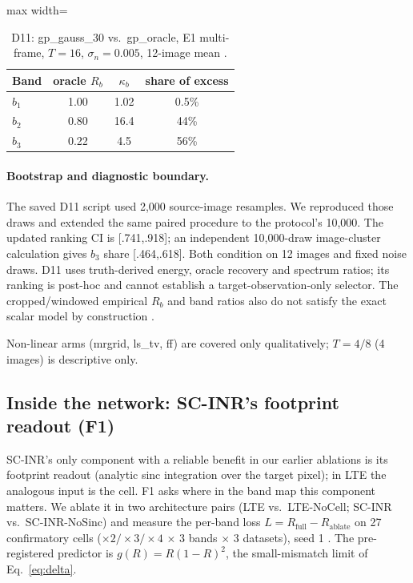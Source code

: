 \begin{table}[t]\centering\small
\caption{D11: gp\_gauss\_30 vs.\ gp\_oracle, E1 multi-frame, $T=16$,
$\sigma_n=0.005$, 12-image mean .}\label{tab:d11}
\begin{adjustbox}{max width=\linewidth}\begin{tabular}{lccc}\toprule
Band & oracle $R_b$ & $\kappa_b$ & share of excess\\\midrule
$b_1$ & 1.00 & 1.02 & 0.5\%\\
$b_2$ & 0.80 & 16.4 & 44\%\\
$b_3$ & 0.22 & 4.5 & 56\%\\
\bottomrule\end{tabular}\end{adjustbox}
\end{table}

\paragraph{Bootstrap and diagnostic boundary.} The saved D11 script used
2,000 source-image resamples. We reproduced those draws and extended the
same paired procedure to the protocol's 10,000. The updated ranking CI is
[.741,.918]; an independent 10,000-draw image-cluster calculation gives
$b_3$ share [.464,.618]. Both condition on 12 images and fixed noise draws.
D11 uses truth-derived energy, oracle recovery and spectrum ratios;
its ranking is post-hoc and cannot establish a target-observation-only
selector. The cropped/windowed empirical $R_b$ and band ratios also do not
satisfy the exact scalar model by construction .

\noindent Non-linear arms (mrgrid, ls\_tv, ff) are covered only
qualitatively; $T=4/8$ (4 images) is descriptive only.


\subsection{Inside the network: SC-INR's footprint readout (F1)}\label{sec:exp-f1}

SC-INR's only component with a reliable benefit in our earlier ablations is
its footprint readout (analytic sinc integration over the target pixel); in
LTE the analogous input is the cell. F1 asks where in the band map this
component matters. We ablate it in two architecture pairs (LTE vs.\
LTE-NoCell; SC-INR vs.\ SC-INR-NoSinc) and measure the per-band loss
$L=R_{\mathrm{full}}-R_{\mathrm{ablate}}$ on 27 confirmatory cells
($\times2/\times3/\times4$ $\times$ 3 bands $\times$ 3 datasets), seed 1
\src{F1}. The pre-registered predictor is $g(R)=R(1-R)^2$, the
small-mismatch limit of Eq.~\eqref{eq:delta}.

